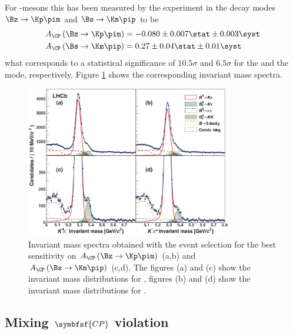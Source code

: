 For \B-mesons this has been measured by the \lhcb experiment in the decay modes $\Bz\to\Kp\pim$ and $\Bs\to\Km\pip$ \cite{LHCb-PAPER-2013-018} to be
\begin{equation}
\begin{split}
A_{\CP}\left(\Bz\to\Kp\pim\right) &= -0.080\pm0.007\stat \pm 0.003\syst\\
A_{\CP}\left(\Bs\to\Km\pip\right) &= 0.27\pm0.04\stat \pm 0.01\syst
\end{split}
\end{equation}
what corresponds to a statistical significance of $10.5\sigma$ and $6.5\sigma$ for the \Bz and the \Bs mode, respectively.
Figure \ref{fig:DirectCPV} shows the corresponding invariant mass spectra.
\begin{figure}[tbp]
	\centering
	\includegraphics[width=0.8\textwidth]{03CPV/figs/DirectCPV.pdf}
	\caption{Invariant mass spectra obtained with the event selection for the best sensitivity on $A_{\CP}\left(\Bz\to\Kp\pim\right)$ (a,b) and $A_{\CP}\left(\Bs\to\Km\pip\right)$ (c,d). The figures (a) and (c) show the invariant mass distributions for \Kp\pim, figures (b) and (d) show the invariant mass distributions for \Km\pip.}
	\label{fig:DirectCPV}
\end{figure}


\subsection[head={Mixing \CP violation},tocentry={Mixing \CP violation}]{Mixing $\symbfsf{C{}P}$ violation}
\label{sec:MixingCPV}

